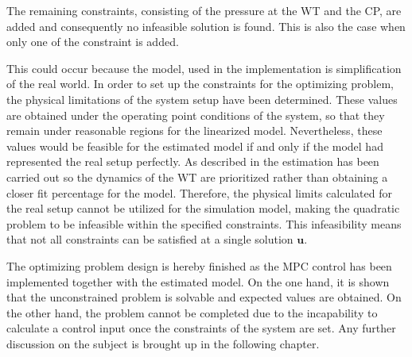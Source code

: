 The remaining constraints, consisting of the pressure at the WT and the CP, are added and consequently no infeasible solution is found. This is also the case when only one of the constraint is added. 

This could occur because the model, used in the implementation is simplification of the real world. In order to set up the constraints for the optimizing problem, the physical limitations of the system setup have been determined. These values are obtained under the operating point conditions of the system, so that they remain under reasonable regions for the linearized model. Nevertheless, these values would be feasible for the estimated model if and only if the model had represented the real setup perfectly. As described in  the estimation has been carried out so the dynamics of the WT are prioritized rather than obtaining a closer fit percentage for the model. Therefore, the physical limits calculated for the real setup cannot be utilized for the simulation model, making the quadratic problem to be infeasible within the specified constraints. This infeasibility means that not all constraints can be satisfied at a single solution $\bm{u}$.

The optimizing problem design is hereby finished as the MPC control has been implemented together with the estimated model. On the one hand, it is shown that the unconstrained problem is solvable and expected values are obtained. On the other hand, the problem cannot be completed due to the incapability to calculate a control input once the constraints of the system are set. Any further discussion on the subject is brought up in the following chapter. 




%
%
%
%
%

